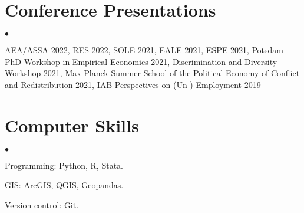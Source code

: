 \documentclass[margin,line]{res}
\newenvironment{list2}{
  \begin{list}{$\bullet$}{%
      \setlength{\itemsep}{0in}
      \setlength{\parsep}{0in} \setlength{\parskip}{0in}
      \setlength{\topsep}{0in} \setlength{\partopsep}{0in} 
      \setlength{\leftmargin}{0.2in}}}{\end{list}}
\begin{document}
\begin{resume}
\section{\sc Conference Presentations} 
\begin{list2}
	\item AEA/ASSA 2022, RES 2022, SOLE 2021, EALE 2021, ESPE 2021, Potsdam PhD Workshop in Empirical Economics 2021, Discrimination and Diversity Workshop 2021, Max Planck Summer School of the Political Economy of Conflict and Redistribution 2021, IAB Perspectives on (Un-) Employment 2019 
\end{list2}
\vspace*{.05in} 
\section{\sc Computer Skills} 
\begin{list2}
\item Programming: Python, R, Stata.
\item GIS:  ArcGIS, QGIS, Geopandas.
\item Version control: Git.\\ 
\end{list2}



\end{resume}
\end{document}
